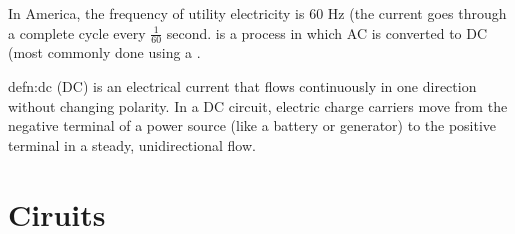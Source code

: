 In America, the frequency of utility electricity is 60 Hz (the current goes through a complete cycle every $\frac{1}{60}$ second.  is a process in which AC is converted to DC (most commonly done using a .

\begin{defn}{defn:dc}
 (DC) is an electrical current that flows continuously in one direction without changing polarity. In a DC circuit, electric charge carriers move from the negative terminal of a power source (like a battery or generator) to the positive terminal in a steady, unidirectional flow.
\end{defn}





\section{Ciruits}

